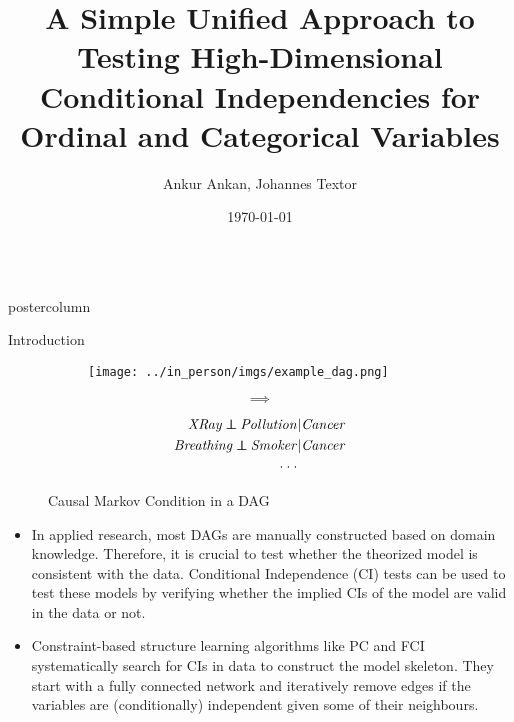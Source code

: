 \documentclass{beamer}
\title{\huge A Simple Unified Approach to Testing High-Dimensional Conditional Independencies for Ordinal and Categorical Variables}
\author{Ankur Ankan, Johannes Textor}
\institute[RU]{Institute for Computing and Information Sciences \\ Radboud University, Netherlands}
\date{\today}
\def\ci{\perp\!\!\!\!\!\perp}
\newlength{\columnheight}
\begin{document}
\begin{frame}
\begin{columns}
	\begin{column}{.33\textwidth}
		\begin{beamercolorbox}[center]{postercolumn}
			\begin{minipage}{.98\textwidth}  %
				\parbox[t][\columnheight]{\textwidth}{ %
	\begin{myblock}{Introduction}
		\begin{figure}
			\begin{subfigure}{0.4\textwidth}
				\centering
				\texttt{[image: ../in\_person/imgs/example\_dag.png]}
			\end{subfigure}\hfill%
			\begin{subfigure}{0.1\textwidth}
				$$ \bm{\implies} $$
			\end{subfigure}\hfill%
			\begin{subfigure}{0.5\textwidth}
				\begin{equation*}
					\begin{split}
						\text{\emph{XRay}} \ci \text{\emph{Pollution}}  &| \text{\emph{Cancer}} \\
						\text{\emph{Breathing}} \ci \text{\emph{Smoker}} &| \text{\emph{Cancer}} \\
						\cdot \cdot \cdot & \\
					\end{split}
				\end{equation*}
			\end{subfigure}
			\caption*{Causal Markov Condition in a DAG \footnotemark}
		\end{figure}
		\begin{itemize}
			\item \justifying In applied research, most DAGs are
				manually constructed based on domain knowledge.
				Therefore, it is crucial to test whether the
				theorized model is consistent with the data.
				Conditional Independence (CI) tests can be used
				to test these models by verifying whether the
				implied CIs of the model are valid in the data
				or not.
			\item \justifying Constraint-based structure learning algorithms like PC and FCI systematically search
				for CIs in data to construct the model skeleton. They start with
				a fully connected network and iteratively remove edges if the variables 
				are (conditionally) independent given some of their neighbours.
		\end{itemize}


\end{myblock}}
\end{minipage}
\end{beamercolorbox}
\end{column}
\end{columns}
\end{frame}
\end{document}
